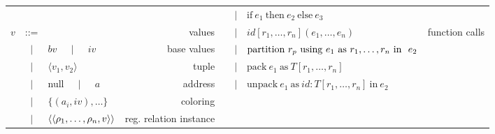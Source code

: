 {\begin{figure*}
{\begin{tabular}{cclr|cclr}
& & & &   
       & $\mid$& $\text{if}\ e_1\ \text{then}\ e_2\ \text{else}\ e_3$ &  \\
$v$ & ::= & & values &   
       & $\mid$& $id[r_1, \ldots, r_n](e_1,\ldots,e_n)$ & function calls \\
  &$\mid$& $bv$ $\;\;\;\mid\;\;\;$ $iv$ & base values &   
       & $\mid$ & $\text{partition}\ r_p\text{ using }e_1\text{ as }{r}_1,\ldots,{r}_n\text{ in }\ e_2$ &  \\
  &$\mid$& $\langle v_1, v_2 \rangle$ & tuple & 
       & $\mid$& $\text{pack}\ e_1\ \text{as}\ T[r_1,\ldots,r_n]$ &  \\
  &$\mid$& null $\;\;\;\mid\;\;\;$ $a$ & address & 
       & $\mid$& $\text{unpack}\ e_1\ \text{as}\ id : T[r_1,\ldots,r_n]\ \text{in}\ e_2$ &  \\
  &$\mid$& $\{ (a_i, iv), \ldots \}$ & coloring & 
    & & & \\
  &$\mid$& $\langle \langle {\rho}_1,\ldots,{\rho}_n, v\rangle \rangle$ & reg. relation instance & 
   & & & \\

\end{tabular}}
\end{figure*}}
